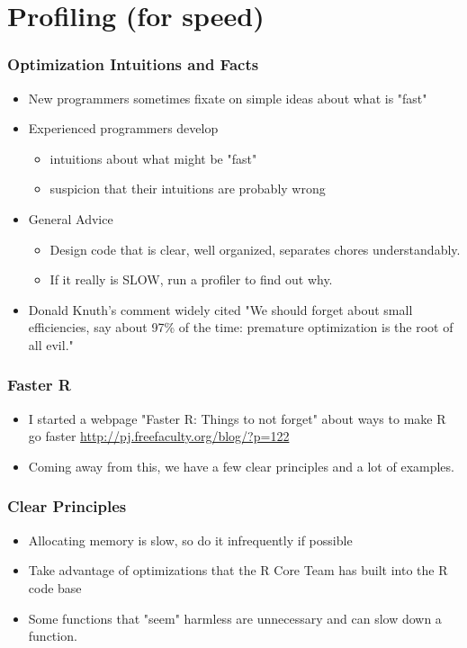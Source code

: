 \documentclass[10pt,english]{beamer}
\begin{document}
\section{Profiling (for speed)}


\begin{frame}[containsverbatim]
  \frametitle{Optimization Intuitions and Facts}
  
  \begin{itemize}
  \item New programmers sometimes fixate on simple ideas about what is "fast"
  \item Experienced programmers develop 
    \begin{itemize}
    \item intuitions about what might be "fast"
      \item suspicion that their intuitions are probably wrong
    \end{itemize}
   \item General Advice
       \begin{itemize}
       \item Design code that is clear, well organized, separates
         chores understandably. 
       \item If it really is SLOW, run a profiler to find out why.
      \end{itemize}
   \item Donald Knuth's comment widely cited
      "We should forget about small efficiencies, say about 97\% of the time: premature optimization is the root of all evil."
  \end{itemize}
\end{frame}

\begin{frame}
  \frametitle{Faster R}
  \begin{itemize}
  \item I started a webpage "Faster R: Things to not forget" about ways to
  make R go faster \url{http://pj.freefaculty.org/blog/?p=122}
  \item Coming away from this, we have a few clear principles and a
    lot of examples.
  \end{itemize}
\end{frame}


\begin{frame}
  \frametitle{Clear Principles}
   \begin{itemize}
   \item Allocating memory is slow, so do it infrequently if possible
   \item Take advantage of optimizations that the R Core Team has
     built into the R code base
   \item Some functions that "seem" harmless are unnecessary and can
     slow down a function.
   \end{itemize}
 \end{frame}
 
\end{document}
